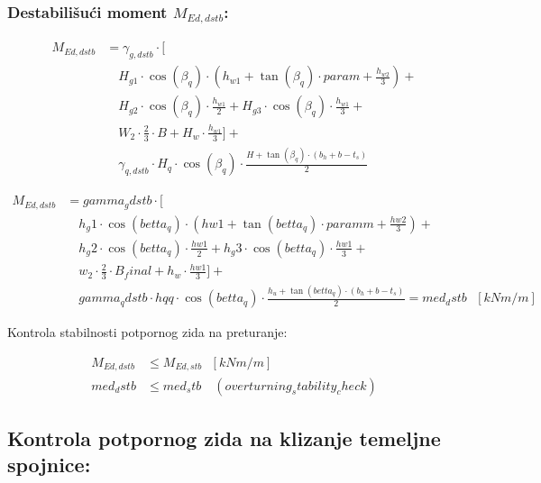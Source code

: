 \documentclass[a4paper, 11pt]{article}
\begin{document}
\subsubsection*{Destabili\v{s}u\'ci moment $M_{Ed,dstb}$:}

\begin{align*}
M_{Ed,dstb} &= \gamma_{g,dstb} \cdot \bigg[ \\
		   &\quad H_{g1} \cdot \cos(\beta_{q}) \cdot \left( h_{w1} + \tan(\beta_{q}) \cdot param + \frac{h_{w2}}{3} \right) + \\
		   &\quad H_{g2} \cdot \cos(\beta_{q}) \cdot \frac{h_{w1}}{2} + H_{g3} \cdot \cos(\beta_{q}) \cdot \frac{h_{w1}}{3} + \\
		   &\quad W_{2} \cdot \frac{2}{3} \cdot B + H_{w} \cdot \frac{h_{w1}}{3} \bigg] + \\
		   &\quad \gamma_{q,dstb} \cdot H_{q} \cdot \cos(\beta_{q}) \cdot \frac{H + \tan(\beta_{q}) \cdot (b_{h} + b - t_{s})}{2}
\end{align*}

\begin{align*}
M_{Ed,dstb} &= gamma_gdstb \cdot \bigg[ \\
		   &\quad h_g1 \cdot \cos(betta_q) \cdot \left( hw1 + \tan(betta_q) \cdot paramm + \frac{hw2}{3} \right) + \\
		   &\quad h_g2 \cdot \cos(betta_q) \cdot \frac{hw1}{2} + h_g3 \cdot \cos(betta_q) \cdot \frac{hw1}{3} + \\
		   &\quad w_2 \cdot \frac{2}{3} \cdot B_final + h_w \cdot \frac{hw1}{3} \bigg] + \\
		   &\quad gamma_qdstb \cdot hqq \cdot \cos(betta_q) \cdot \frac{h_u + \tan(betta_q) \cdot (b_h + b - t_s)}{2} = med_dstb \text{ } [kNm/m] 
\end{align*}

Kontrola stabilnosti potpornog zida na preturanje:

\begin{align*}
M_{Ed,dstb} &\leq M_{Ed,stb} \text{ } [kNm/m] \\
med_dstb &\leq med_stb \quad \left( overturning_stability_check \right)
\end{align*}

\subsection*{Kontrola potpornog zida na klizanje temeljne spojnice:}
\end{document}
